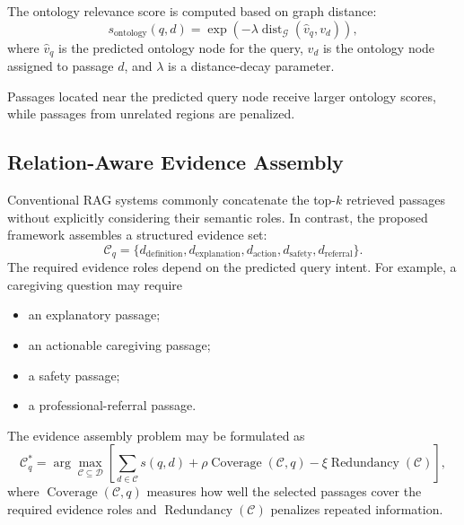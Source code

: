 \documentclass{article}
\begin{document}
The ontology relevance score is computed based on graph distance:
\begin{equation}
    s_{\mathrm{ontology}}(q,d)
    =
    \exp
    \left(
    -\lambda
    \operatorname{dist}_{\mathcal{G}}
    (\hat{v}_q,v_d)
    \right),
\end{equation}
where $\hat{v}_q$ is the predicted ontology node for the query, $v_d$ is the ontology node assigned to passage $d$, and $\lambda$ is a distance-decay parameter.

Passages located near the predicted query node receive larger ontology scores, while passages from unrelated regions are penalized.

\subsection{Relation-Aware Evidence Assembly}

Conventional RAG systems commonly concatenate the top-$k$ retrieved passages without explicitly considering their semantic roles. In contrast, the proposed framework assembles a structured evidence set:
\begin{equation}
    \mathcal{C}_q =
    \{
    d_{\mathrm{definition}},
    d_{\mathrm{explanation}},
    d_{\mathrm{action}},
    d_{\mathrm{safety}},
    d_{\mathrm{referral}}
    \}.
\end{equation}
The required evidence roles depend on the predicted query intent. For example, a caregiving question may require
\begin{itemize}
    \item an explanatory passage;
    \item an actionable caregiving passage;
    \item a safety passage;
    \item a professional-referral passage.
\end{itemize}
The evidence assembly problem may be formulated as
\begin{equation}
    \mathcal{C}_q^{*}
    =
    \arg\max_{\mathcal{C} \subseteq \mathcal{D}}
    \left[
    \sum_{d \in \mathcal{C}} s(q,d)
    +
    \rho \operatorname{Coverage}(\mathcal{C},q)
    -
    \xi \operatorname{Redundancy}(\mathcal{C})
    \right],
\end{equation}
where $\operatorname{Coverage}(\mathcal{C},q)$ measures how well the selected 
passages cover the required evidence roles and 
$\operatorname{Redundancy}(\mathcal{C})$ penalizes repeated information.
\end{document}
